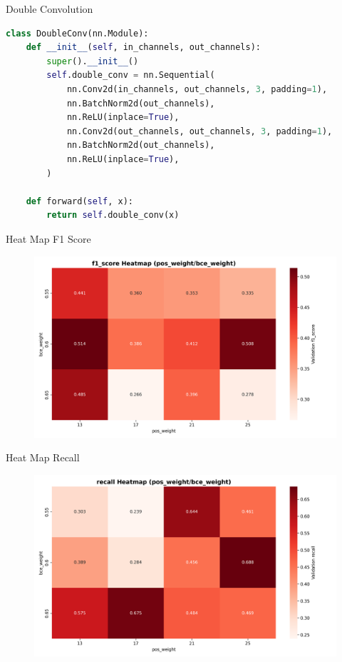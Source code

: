 \documentclass{beamer}
\begin{document}
\begin{frame}[fragile]{Double Convolution}
    \begin{lstlisting}[language=Python]
class DoubleConv(nn.Module):
    def __init__(self, in_channels, out_channels):
        super().__init__()
        self.double_conv = nn.Sequential(
            nn.Conv2d(in_channels, out_channels, 3, padding=1),
            nn.BatchNorm2d(out_channels),
            nn.ReLU(inplace=True),
            nn.Conv2d(out_channels, out_channels, 3, padding=1),
            nn.BatchNorm2d(out_channels),
            nn.ReLU(inplace=True),
        )

    def forward(self, x):
        return self.double_conv(x)
    \end{lstlisting}
\end{frame}

\begin{frame}{Heat Map F1 Score}
    \begin{figure}
        \centering
        \includegraphics[height=0.7\textheight]{Images/12_heatmap_f1_score_by_weights.png}
    \end{figure}
\end{frame}

\begin{frame}{Heat Map Recall}
    \begin{figure}
        \centering
        \includegraphics[height=0.7\textheight]{Images/12_heatmap_recall_by_weights.png}
    \end{figure}
\end{frame}
\end{document}
